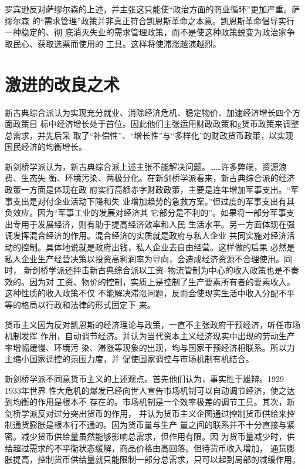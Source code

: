 罗宾逊反对萨缪尔森的上述，并主张这只能使“政治方面的商业循环”更加严重。萨缪尔森
的“需求管理”政策并非真正符合凯恩斯革命之本意。凯恩斯革命倡导实行一种稳定的、彻
底消灭失业的需求管理政策，而不是使这种政策蜕变为政治家争取民心、获取选票而使用的
工具。这样将使滞涨越演越烈。

\section{激进的改良之术}

新古典综合派认为实现充分就业、消除经济危机、稳定物价、加速经济增长四个方面政策目
标中经济增长处于首位。因此他们主张运用财政政策和g货币政策来调整总需求，并先后采
取了“补偿性”、“增长性”与“多样化”的财政货币政策，以实现国民经济的均衡增长。

新剑桥学派认为，新古典综合派上述主张不能解决问题。……许多弊端，资源浪费、生态失
衡、环境污染、两极分化。在新剑桥学派看来，新古典综合派的经济政策一方面是体现在政
府实行高额赤字财政政策，主要是连年增加军事支出。“军事支出是对付企业活动下降和失
业增加趋势的急救方案。”但过度的军事支出有其负效应。因为“军事工业的发展对经济其
它部分是不利的”。如果将一部分军事支出专用于发展经济，则有助于提高经济效率和人民
生活水平。另一方面体现在强调发挥混合经济的作用。混合经济的实质就是政府与私人企业
共同实施对经济活动的控制。具体地说就是政府出钱，私人企业去自由经营。这样做的后果
必然是私人企业生产经营决策以投资高利润率为导向，会造成经济资源不合理使用。同时，
新剑桥学派还抨击新古典综合派以工资--物流管制为中心的收入政策也是不奏效的。因为对
工资、物价的控制，实质上是控制了生产要素所有者的要素收入。这种性质的收入政策不仅
不能解决滞涨问题，反而会使现实生活中收入分配不平等的格局以行政和法律的形式固定下
来。

货币主义因为反对凯恩斯的经济理论与政策，一直不主张政府干预经济，听任市场机制发挥
作用，自动调节经济。并认为当代资本主义经济现实中出现的劳动生产率增幅缓慢、环境污
染、滞涨等现象的出现，均与国家干预经济相联系。所以力主缩小国家调控的范围力度，并
促使国家调控与市场机制有机结合。

新剑桥学派不同意货币主义的上述观点。首先他们认为，事实胜于雄辩。1929--1933年世界
性大危机的爆发已经向世人宣告市场机制可以自动调节经济，使之达到均衡的作用是根本不
存在的。市场机制是一个效率极差的调节工具。其次，新剑桥学派反对过分突出货币的作用，
并认为货币主义企图通过控制货币供给来控制通货膨胀是根本行不通的。因为货币量与生产
量之间的联系并不十分直接与紧密。减少货币供给量虽然能够影响总需求，但作用有限。因
为货币量减少时，供给超过需求的不平衡状态缓解，商品价格由高回落。但待货币收入增加，
通货膨胀提高，控制货币供给量就只能限制一部分总需求，只可以起到局部的减缓作用。

